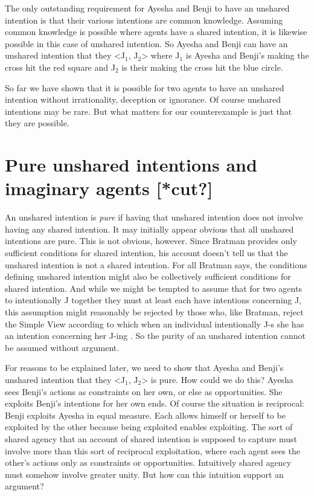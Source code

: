 \documentclass[12pt,\papersize]{extarticle}
\begin{document}
The only outstanding requirement for Ayesha and Benji to have an unshared intention is that their various intentions are common knowledge. 
Assuming common knowledge is possible where agents have a shared intention, it is likewise possible in this case of unshared intention.
So Ayesha and Benji can have an unshared intention that they <J$_1$, J$_2$> where J$_1$ is Ayesha and Benji's making the cross hit the red square and J$_2$ is their making the cross hit the blue circle.

So far we have shown that it is possible for two agents to have an unshared intention without irrationality, deception or ignorance.
Of course unshared intentions may be rare. 
But what matters for our counterexample is just that they are possible. 



\section{Pure unshared intentions and imaginary agents [*cut?]}
An unshared intention is \emph{pure} if having that unshared intention does not involve having any shared intention. 
It may initially appear obvious that all unshared intentions are pure. 
This is not obvious, however.
Since Bratman provides only sufficient conditions for shared intention, his account doesn't tell us that the unshared intention is not a shared intention.
For all Bratman says, the conditions defining unshared intention might also be collectively sufficient conditions for shared intention. 
And while we might be tempted to assume that for two agents to intentionally J together they must at least each have intentions concerning J, 
this assumption might reasonably be rejected by those who, like Bratman, reject the Simple View according to which when an individual intentionally J-s she has an intention concerning her J-ing \citep{Bratman:1984jr}.
So the purity of an unshared intention cannot be assumed without argument.

For reasons to be explained later, we need to show that  Ayesha and Benji's unshared intention that they <J$_1$, J$_2$>  is pure.
How could we do this? 
Ayesha sees Benji's actions as constraints on her own, or else as opportunities.
She exploits Benji's intentions for her own ends.
Of course the situation is reciprocal: Benji exploits Ayesha in equal measure.
Each allows himself or herself to be exploited by the other because being exploited enables exploiting.
The sort of shared agency that an account of shared intention is supposed to capture must involve more than this sort of reciprocal exploitation, where each agent sees the other's actions only as constraints or opportunities. 
Intuitively shared agency must somehow involve greater unity.
But how can this intuition support an argument?
\end{document}
